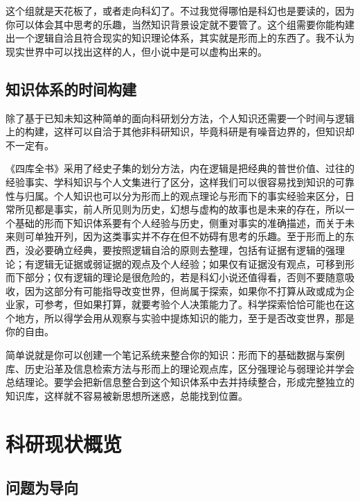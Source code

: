 \documentclass[]{tufte-book}
\begin{document}
这个组就是天花板了，或者走向科幻了。不过我觉得哪怕是科幻也是要读的，因为你可以体会其中思考的乐趣，当然知识背景设定就不要管了。这个组需要你能构建出一个逻辑自洽且符合现实的知识理论体系，其实就是形而上的东西了。我不认为现实世界中可以找出这样的人，但小说中是可以虚构出来的。

\hypertarget{ux77e5ux8bc6ux4f53ux7cfbux7684ux65f6ux95f4ux6784ux5efa}{%
\section{知识体系的时间构建}\label{ux77e5ux8bc6ux4f53ux7cfbux7684ux65f6ux95f4ux6784ux5efa}}

除了基于已知未知这种简单的面向科研划分方法，个人知识还需要一个时间与逻辑上的构建，这样可以自洽于其他非科研知识，毕竟科研是有噪音边界的，但知识却不一定有。

《四库全书》采用了经史子集的划分方法，内在逻辑是把经典的普世价值、过往的经验事实、学科知识与个人文集进行了区分，这样我们可以很容易找到知识的可靠性与归属。个人知识也可以分为形而上的观点理论与形而下的事实经验来区分，日常所见都是事实，前人所见则为历史，幻想与虚构的故事也是未来的存在，所以一个基础的形而下知识体系要有个人经验与历史，侧重对事实的准确描述，而关于未来则可单独开列，因为这类事实并不存在但不妨碍有思考的乐趣。至于形而上的东西，没必要确立经典，要按照逻辑自洽的原则去整理，包括有证据有逻辑的强理论；有逻辑无证据或弱证据的观点及个人经验；如果仅有证据没有观点，可移到形而下部分；仅有逻辑的理论是很危险的，若是科幻小说还值得看，否则不要随意吸收，因为这部分有可能指导改变世界，但尚属于探索，如果你不打算从政或成为企业家，可参考，但如果打算，就要考验个人决策能力了。科学探索恰恰可能也在这个地方，所以得学会用从观察与实验中提炼知识的能力，至于是否改变世界，那是你的自由。

简单说就是你可以创建一个笔记系统来整合你的知识：形而下的基础数据与案例库、历史沿革及信息检索方法与形而上的理论观点库，区分强理论与弱理论并学会总结理论。要学会把新信息整合到这个知识体系中去并持续整合，形成完整独立的知识库，这样就不容易被新思想所迷惑，总能找到位置。

\hypertarget{view}{%
\chapter{科研现状概览}\label{view}}

\hypertarget{ux95eeux9898ux4e3aux5bfcux5411}{%
\section{问题为导向}\label{ux95eeux9898ux4e3aux5bfcux5411}}
\end{document}
